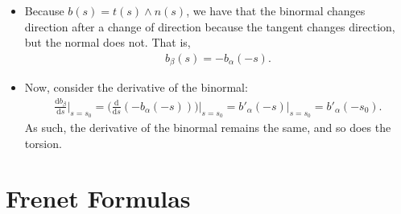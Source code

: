 \documentclass[10pt]{article}
\newcommand{\dee}{\mathrm{d}}
\begin{document}
\begin{itemize}
    \item Because $b(s) = t(s) \wedge n(s)$, we have that the binormal changes direction after a change of direction because the tangent changes direction, but the normal does not. That is,
    \begin{align*}
      b_\beta(s) = -b_\alpha(-s).
    \end{align*}    

    \item Now, consider the derivative of the binormal:
    \begin{align*}
      \frac{\dee b_\beta}{\dee s} \bigg|_{s=s_0}
      = \bigg( \frac{\dee }{\dee s} (-b_\alpha(-s)) \bigg)\bigg|_{s=s_0}
      = b'_\alpha(-s) \bigg|_{s=s_0}
      = b'_\alpha(-s_0).
    \end{align*}
    As such, the derivative of the binormal remains the same, and so does the torsion.
  \end{itemize}

  \section{Frenet Formulas} %
  \label{sec:frenet_formula}
  
\end{document}
